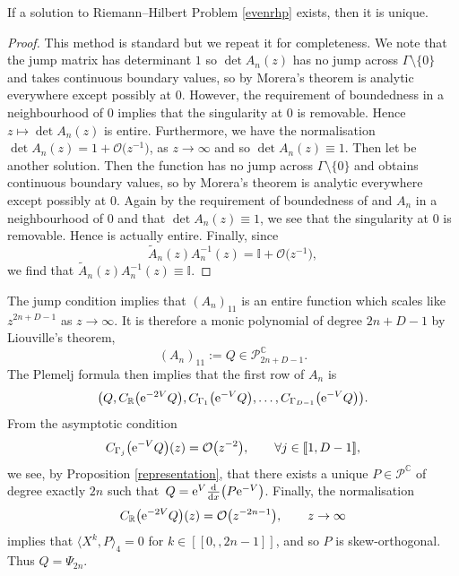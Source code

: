 \begin{Lemma}\label{uniqueness} If a solution to Riemann--Hilbert Problem {\rm \ref{evenrhp}} exists, then it is unique.
\end{Lemma}
\begin{proof}
This method is standard but we repeat it for completeness. We note that the jump matrix has determinant $1$ so $\det A_{n}(z) $ has no jump across $\Gamma \setminus \{ 0 \}$ and takes continuous boundary values, so by Morera's theorem is analytic everywhere except possibly at $0$. However, the requirement of boundedness in a neighbourhood of $0$ implies that the singularity at $0$ is removable. Hence $z \mapsto \det A_{n}(z)$ is entire. Furthermore, we have the normalisation
$\det A_{n}(z) = 1 + \mathcal{O}\big(z^{-1}\big)$,
 as $z \to \infty$ and so $\det A_{n}(z) \equiv 1$.
Then let  be another solution. Then the function 
has no jump across $\Gamma \setminus \{0 \}$ and obtains continuous boundary values, so by Morera's theorem is analytic everywhere except possibly at $0$. Again by the requirement of boundedness of  and $A_n$ in a neighbourhood of $0$ and that $\det A_n(z) \equiv 1$, we see that the singularity at $0$ is removable. Hence  is actually entire. Finally, since
\begin{equation*}
\tilde{A}_{n}(z) A_{n}^{-1}(z) = \mathbb{I}+\mathcal{O}\big(z^{-1}\big),
\end{equation*}
we find that $\tilde{A}_{n}(z) A_{n}^{-1}(z) \equiv \mathbb{I}$.
\end{proof}

The jump condition implies that $(A_{n})_{11}$ is an entire function which scales like $z^{2n+D-1}$ as $z \to \infty$. It is therefore a monic polynomial of degree $2n+D-1$ by Liouville's theorem,
\begin{equation*}
(A_{n})_{11} := Q \in \mathscr{P}_{2n+D-1}^\mathbb{C}.
\end{equation*}
The Plemelj formula then implies that the first row of $A_{n}$ is
\begin{equation*}
\big( Q , C_{\mathbb{R}}\big({\rm e}^{-2V} Q\big) , C_{\Gamma_1}\big({\rm e}^{-V} Q\big) , \dots , C_{\Gamma_{D-1}}\big({\rm e}^{-V} Q\big)\big).
\end{equation*}
 From the asymptotic condition
 \begin{align*}
 C_{\Gamma_j}\big({\rm e}^{-V} Q\big)(z) = \mathcal{O}\big(z^{-2}\big),\qquad \forall j \in [\![ 1,D-1]\!],
 \end{align*}
we see, by Proposition \ref{representation}, that there exists a unique $P \in \mathscr{P}^\mathbb{C}$ of degree exactly $2n$ such that~${Q = {\rm e}^{V} \frac{\rm d}{{\rm d}x}\big(P {\rm e}^{-V}\big)}$. Finally, the normalisation
\begin{align*}
C_{\mathbb{R}}\big({\rm e}^{-2V} Q\big)(z) = \mathcal{O}\big(z^{-2n-1}\big) ,\qquad z \to \infty
\end{align*}
implies that $\langle \mathit{X}^k , P\rangle_4 =0 $ for $k \in [\![0, , 2n-1]\!]$, and so $P$ is skew-orthogonal. Thus $Q = \Psi_{2n}$.

